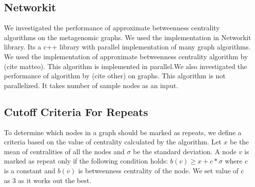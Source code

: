 \documentclass[runningheads,a4paper]{llncs}
\begin{document}
\subsection*{Networkit}
We investigated the performance of approximate betweenness centrality algorithms on the metagenomic graphs. We used the implementation in Networkit\cite{networkit} library. Its a c++ library with parallel implementation of many graph algorithms. We used the implementation of approximate betweenness centrality algorithm by (cite matteo). This algorithm is implemented in parallel.We also investigated the performance of algorithm by (cite other) on graphs. This algorithm is not parallelized. It takes number of sample nodes as an input. 

\subsection*{Cutoff Criteria For Repeats}
To determine which nodes in a graph should be marked as repeats, we define a criteria based on the value of centrality calculated by the algorithm. Let $x$ be the mean of centralities of all the nodes and $\sigma$ be the standard deviation. A node $v$ is marked as repeat only if the following condition holds: $b(v) \geq x + c*\sigma$ where $c$ is a constant and $b(v)$ is betweenness centrality of the node. We set value of $c$ as 3 as it works out the best. 
\end{document}
